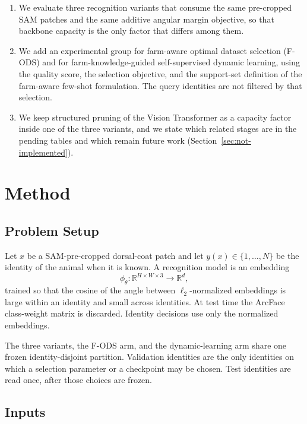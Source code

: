 \begin{enumerate}
    \item We evaluate three recognition variants that consume the same pre-cropped SAM patches and the same additive angular margin objective, so that backbone capacity is the only factor that differs among them.
    \item We add an experimental group for farm-aware optimal dataset selection (F-ODS) and for farm-knowledge-guided self-supervised dynamic learning, using the quality score, the selection objective, and the support-set definition of the farm-aware few-shot formulation. The query identities are not filtered by that selection.
    \item We keep structured pruning of the Vision Transformer as a capacity factor inside one of the three variants, and we state which related stages are in the pending tables and which remain future work (Section~\ref{sec:not-implemented}).
\end{enumerate}

\section{Method}
\label{sec:method}

\subsection{Problem Setup}
\label{sec:setup}

Let $x$ be a SAM-pre-cropped dorsal-coat patch and let $y(x)\in\{1,\ldots,N\}$ be the identity of the animal when it is known. A recognition model is an embedding
\begin{equation}
    \phi_{\theta}:\mathbb{R}^{H\times W\times 3}\rightarrow\mathbb{R}^{d},
    \label{eq:embedding}
\end{equation}
trained so that the cosine of the angle between $\ell_2$-normalized embeddings is large within an identity and small across identities. At test time the ArcFace class-weight matrix is discarded. Identity decisions use only the normalized embeddings.

The three variants, the F-ODS arm, and the dynamic-learning arm share one frozen identity-disjoint partition. Validation identities are the only identities on which a selection parameter or a checkpoint may be chosen. Test identities are read once, after those choices are frozen.

\subsection{Inputs}
\label{sec:inputs}

